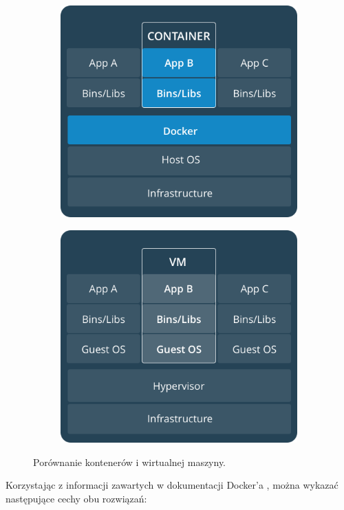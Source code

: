 \begin{figure}[h]
  \centering
  \begin{subfigure}{.5\textwidth}
    \centering
    \includegraphics[width=.6\linewidth]{images/docker_container}
    \label{fig:docker_container}
  \end{subfigure}%
  \begin{subfigure}{.5\textwidth}
    \centering
    \includegraphics[width=.6\linewidth]{images/docker_vm}
    \label{fig:docker_vm}
  \end{subfigure}
  \caption{Porównanie kontenerów i wirtualnej maszyny.}
\end{figure}

Korzystając z informacji zawartych w dokumentacji Docker'a \cite{docker_what_container}, można wykazać następujące cechy obu rozwiązań:

